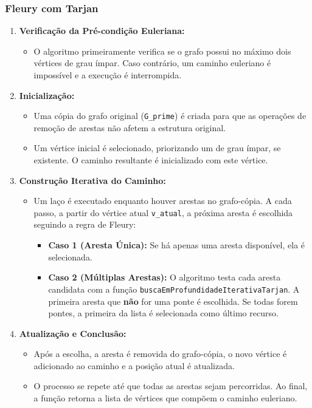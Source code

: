 \documentclass[12pt]{article}
\begin{document}
\subsubsection{Fleury com Tarjan}

\begin{enumerate}
    \item \textbf{Verifica\c{c}\~ao da Pr\'e-condi\c{c}\~ao Euleriana:}
    \begin{itemize}
        \item O algoritmo primeiramente verifica se o grafo possui no m\'aximo dois v\'ertices de grau \'impar. Caso contr\'ario, um caminho euleriano \'e imposs\'ivel e a execu\c{c}\~ao \'e interrompida.
    \end{itemize}

    \item \textbf{Inicializa\c{c}\~ao:}
    \begin{itemize}
        \item Uma c\'opia do grafo original (\texttt{G\_prime}) \'e criada para que as opera\c{c}\~oes de remo\c{c}\~ao de arestas n\~ao afetem a estrutura original.
        \item Um v\'ertice inicial \'e selecionado, priorizando um de grau \'impar, se existente. O caminho resultante \'e inicializado com este v\'ertice.
    \end{itemize}

    \item \textbf{Constru\c{c}\~ao Iterativa do Caminho:}
    \begin{itemize}
        \item Um la\c{c}o \'e executado enquanto houver arestas no grafo-c\'opia. A cada passo, a partir do v\'ertice atual \texttt{v\_atual}, a pr\'oxima aresta \'e escolhida seguindo a regra de Fleury:
        \begin{itemize}
            \item \textbf{Caso 1 (Aresta \'Unica):} Se h\'a apenas uma aresta dispon\'ivel, ela \'e selecionada.
            \item \textbf{Caso 2 (M\'ultiplas Arestas):} O algoritmo testa cada aresta candidata com a fun\c{c}\~ao \texttt{buscaEmProfundidadeIterativaTarjan}. A primeira aresta que \textbf{n\~ao} for uma ponte \'e escolhida. Se todas forem pontes, a primeira da lista \'e selecionada como \'ultimo recurso.
        \end{itemize}
    \end{itemize}
    
    \item \textbf{Atualiza\c{c}\~ao e Conclus\~ao:}
    \begin{itemize}
        \item Ap\'os a escolha, a aresta \'e removida do grafo-c\'opia, o novo v\'ertice \'e adicionado ao caminho e a posi\c{c}\~ao atual \'e atualizada.
        \item O processo se repete at\'e que todas as arestas sejam percorridas. Ao final, a fun\c{c}\~ao retorna a lista de v\'ertices que comp\~oem o caminho euleriano.
    \end{itemize}
\end{enumerate}
\end{document}
